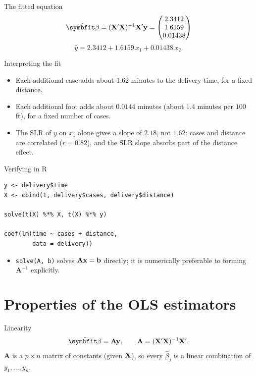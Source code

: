 \begin{frame}{The fitted equation}
    \[
    \hat{\bbeta} = (\bX'\bX)^{-1}\bX'\by =
    \begin{pmatrix} 2.3412 \\ 1.6159 \\ 0.01438 \end{pmatrix}
    \]
    \[
    \hat y = 2.3412 + 1.6159\,x_1 + 0.01438\,x_2.
    \]
\end{frame}


\begin{frame}{Interpreting the fit}
    \begin{itemize}
        \item Each additional case adds about $1.62$ minutes to the delivery time, for a fixed distance.
        \item Each additional foot adds about $0.0144$ minutes (about $1.4$ minutes per $100$ ft), for a fixed number of cases.
        \item The SLR of $y$ on $x_1$ alone gives a slope of $2.18$, not $1.62$: cases and distance are correlated ($r=0.82$), and the SLR slope absorbs part of the distance effect.
    \end{itemize}
\end{frame}


\begin{frame}[fragile]{Verifying in R}
    \begin{verbatim}
y <- delivery$time
X <- cbind(1, delivery$cases, delivery$distance)

solve(t(X) %*% X, t(X) %*% y)

coef(lm(time ~ cases + distance,
        data = delivery))
\end{verbatim}
    \begin{itemize}
        \item \texttt{solve(A, b)} solves $\mathbf{A}\mathbf{x}=\mathbf{b}$ directly; it is numerically preferable to forming $\mathbf{A}^{-1}$ explicitly.
    \end{itemize}
\end{frame}


\section{Properties of the OLS estimators}


\begin{frame}{Linearity}
    \begin{align}
        \hat{\bbeta} = \mathbf{A}\by, \qquad \mathbf{A} = (\bX'\bX)^{-1}\bX'. \label{eq:linear}
    \end{align}
    $\mathbf{A}$ is a $p\times n$ matrix of constants (given $\mathbf{X}$), so every $\hat\beta_j$ is a linear combination of $y_1,\dots,y_n$.
\end{frame}


